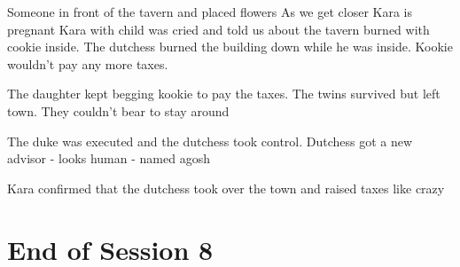 Someone in front of the tavern and placed flowers
As we get closer Kara is pregnant
Kara with child was cried and told us about the tavern burned with cookie inside.
The dutchess burned the building down while he was inside. Kookie wouldn't pay any more taxes.

The daughter kept begging kookie to pay the taxes. 
The twins survived but left town. They couldn't bear to stay around


The duke was executed and the dutchess took control.
Dutchess got a new advisor - looks human - named agosh

Kara confirmed that the dutchess took over the town and raised taxes like crazy



	
\section{End of Session 8}

